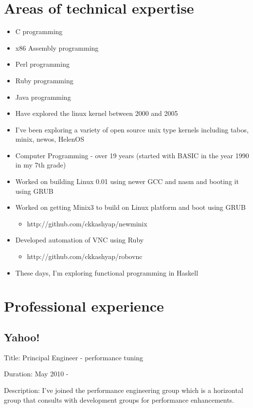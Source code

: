 \documentclass [a4paper,11pt] {article}
\begin{document}
\section*{Areas of technical expertise}
\begin{itemize}
	\item C programming
	\item x86 Assembly programming
	\item Perl programming
	\item Ruby programming
	\item Java programming
	\item Have explored the linux kernel between 2000 and 2005
	\item I’ve been exploring a variety of open source unix type kernels including tabos, minix, newos, HelenOS
	\item Computer Programming - over 19 years (started with BASIC in the year 1990 in my 7th grade)
	\item Worked on building Linux 0.01 using newer GCC and nasm and booting it using GRUB
	\item Worked on getting Minix3 to build on Linux platform and boot using GRUB
		\begin{itemize}
			\item http://github.com/ckkashyap/newminix
		\end{itemize}
	\item Developed automation of VNC using Ruby
		\begin{itemize}
			\item http://github.com/ckkashyap/robovnc
		\end{itemize}
	\item These days, I'm exploring functional programming in Haskell
\end{itemize}


\section*{Professional experience}


\subsection*{Yahoo!}
\begin{description}
\item{Title:} Principal Engineer - performance tuning
\item{Duration:} May 2010 - 
\item{Description:} I've joined the performance engineering group which is a
horizontal group that consults with development groups for performance
enhancements. 
\end{description}
\end{document}
